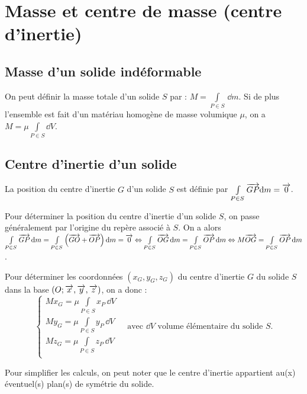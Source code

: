 \documentclass[10pt,fleqn]{article} %
\begin{document}

\setlength{\columnseprule}{.1pt}

\vspace{2cm}
\pagestyle{fancy}
\thispagestyle{plain}


\section{Masse et centre de masse (centre d'inertie)}
\subsection{Masse d'un solide indéformable}
\begin{defi}
On peut définir la masse totale d'un solide $S$ par : $M=\int\limits_{P\in S} \,\dd m$. Si de plus l'ensemble est fait d'un matériau homogène de masse volumique $\mu$, on a $M=\mu \int\limits_{P\in S} \dd V$. \end{defi}

\subsection{Centre d'inertie d'un solide}

\begin{defi}
La position du centre d'inertie $G$ d'un solide $S$ est définie par $\int\limits_{P\in S} \overrightarrow{GP} \text{d} m = \overrightarrow{0}$.
\end{defi}

Pour déterminer la position du centre d'inertie d'un solide $S$, on passe généralement par l'origine du repère associé à $S$. On a alors 
$\int\limits_{P\in S} \overrightarrow{GP} \, \text{d} m=\int\limits_{P\in S} \left(\overrightarrow{GO}+\overrightarrow{OP}\right) \text{d} m = \overrightarrow{0} 
\Leftrightarrow \int\limits_{P\in S} \overrightarrow{OG} \,\text{d} m =\int\limits_{P\in S} \overrightarrow{OP} \,\text{d} m
\Leftrightarrow  M\overrightarrow{OG} =\int\limits_{P\in S} \overrightarrow{OP} \,\text{d} m$.

\begin{methode}
Pour déterminer les coordonnées $\left(x_G,y_G,z_G\right)$ du centre d'inertie $G$ du solide $S$ dans la base $\left(O;\overrightarrow{x},\overrightarrow{y},\overrightarrow{z} \right)$, on a donc :
$$
\left\{
\begin{array}{l}
M x_G =\mu \int\limits_{P\in S} x_P \,\dd V \\
M y_G =\mu \int\limits_{P\in S} y_P \,\dd V \\
M z_G =\mu \int\limits_{P\in S} z_P \,\dd V \\
\end{array}
\right. \quad \text{avec }\dd V \text{ volume élémentaire du solide $S$.}
$$ 

Pour simplifier les calculs, on peut noter que le centre d'inertie appartient au(x) éventuel(s) plan(s) de symétrie du solide.
\end{methode}
\end{document}
